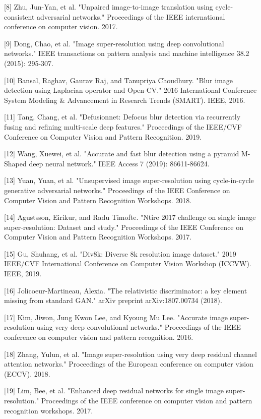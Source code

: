 \documentclass{article}
\begin{document}
[8] Zhu, Jun-Yan, et al. "Unpaired image-to-image translation using cycle-consistent adversarial networks." Proceedings of the IEEE international conference on computer vision. 2017.

[9] Dong, Chao, et al. "Image super-resolution using deep convolutional networks." IEEE transactions on pattern analysis and machine intelligence 38.2 (2015): 295-307.

[10] Bansal, Raghav, Gaurav Raj, and Tanupriya Choudhury. "Blur image detection using Laplacian operator and Open-CV." 2016 International Conference System Modeling \& Advancement in Research Trends (SMART). IEEE, 2016.

[11] Tang, Chang, et al. "Defusionnet: Defocus blur detection via recurrently fusing and refining multi-scale deep features." Proceedings of the IEEE/CVF Conference on Computer Vision and Pattern Recognition. 2019.

[12] Wang, Xuewei, et al. "Accurate and fast blur detection using a pyramid M-Shaped deep neural network." IEEE Access 7 (2019): 86611-86624.

[13] Yuan, Yuan, et al. "Unsupervised image super-resolution using cycle-in-cycle generative adversarial networks." Proceedings of the IEEE Conference on Computer Vision and Pattern Recognition Workshops. 2018.

[14] Agustsson, Eirikur, and Radu Timofte. "Ntire 2017 challenge on single image super-resolution: Dataset and study." Proceedings of the IEEE Conference on Computer Vision and Pattern Recognition Workshops. 2017.

[15] Gu, Shuhang, et al. "Div8k: Diverse 8k resolution image dataset." 2019 IEEE/CVF International Conference on Computer Vision Workshop (ICCVW). IEEE, 2019.

[16] Jolicoeur-Martineau, Alexia. "The relativistic discriminator: a key element missing from standard GAN." arXiv preprint arXiv:1807.00734 (2018).

[17] Kim, Jiwon, Jung Kwon Lee, and Kyoung Mu Lee. "Accurate image super-resolution using very deep convolutional networks." Proceedings of the IEEE conference on computer vision and pattern recognition. 2016.

[18] Zhang, Yulun, et al. "Image super-resolution using very deep residual channel attention networks." Proceedings of the European conference on computer vision (ECCV). 2018.

[19] Lim, Bee, et al. "Enhanced deep residual networks for single image super-resolution." Proceedings of the IEEE conference on computer vision and pattern recognition workshops. 2017.
\end{document}
